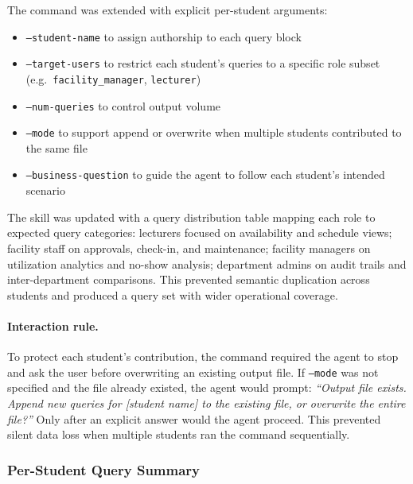 The command was extended with explicit per-student arguments:

\begin{itemize}[noitemsep]
    \item \texttt{--student-name} to assign authorship to each query block
    \item \texttt{--target-users} to restrict each student's queries to a
          specific role subset (e.g.\ \texttt{facility\_manager},
          \texttt{lecturer})
    \item \texttt{--num-queries} to control output volume
    \item \texttt{--mode} to support append or overwrite when multiple
          students contributed to the same file
    \item \texttt{--business-question} to guide the agent to follow each
          student's intended scenario
\end{itemize}

The skill was updated with a query distribution table mapping each role to
expected query categories: lecturers focused on availability and schedule
views; facility staff on approvals, check-in, and maintenance; facility
managers on utilization analytics and no-show analysis; department admins on
audit trails and inter-department comparisons. This prevented semantic
duplication across students and produced a query set with wider operational
coverage.

\paragraph{Interaction rule.}
To protect each student's contribution, the command required the agent to stop
and ask the user before overwriting an existing output file. If \texttt{--mode}
was not specified and the file already existed, the agent would prompt:
\textit{``Output file exists. Append new queries for [student name] to the
existing file, or overwrite the entire file?''} Only after an explicit answer
would the agent proceed. This prevented silent data loss when multiple students
ran the command sequentially.

\subsubsection{Per-Student Query Summary}


